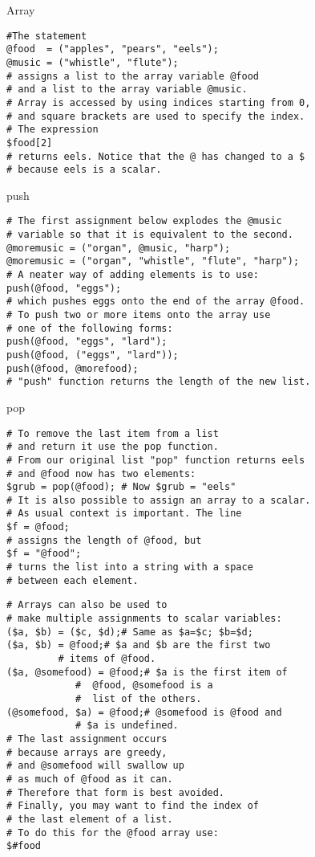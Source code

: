 \begin{frame}[containsverbatim]{Array}
\lstset{language=perl}
\begin{lstlisting}
#The statement 
@food  = ("apples", "pears", "eels");
@music = ("whistle", "flute");
# assigns a list to the array variable @food
# and a list to the array variable @music. 
# Array is accessed by using indices starting from 0,
# and square brackets are used to specify the index.
# The expression 
$food[2]
# returns eels. Notice that the @ has changed to a $
# because eels is a scalar. 
\end{lstlisting}
\end{frame}

\begin{frame}[containsverbatim]{push}
\lstset{language=perl}
\begin{lstlisting}
# The first assignment below explodes the @music
# variable so that it is equivalent to the second. 
@moremusic = ("organ", @music, "harp");
@moremusic = ("organ", "whistle", "flute", "harp");
# A neater way of adding elements is to use:
push(@food, "eggs");
# which pushes eggs onto the end of the array @food.
# To push two or more items onto the array use
# one of the following forms: 
push(@food, "eggs", "lard");
push(@food, ("eggs", "lard"));
push(@food, @morefood);
# "push" function returns the length of the new list. 
\end{lstlisting}
\end{frame}

\begin{frame}[containsverbatim]{pop}
\lstset{language=perl}
\begin{lstlisting}
# To remove the last item from a list
# and return it use the pop function.
# From our original list "pop" function returns eels
# and @food now has two elements: 
$grub = pop(@food);	# Now $grub = "eels"
# It is also possible to assign an array to a scalar.
# As usual context is important. The line 
$f = @food;
# assigns the length of @food, but 
$f = "@food";
# turns the list into a string with a space
# between each element. 
\end{lstlisting}
\end{frame}


\begin{frame}[containsverbatim]{}
\lstset{language=perl}
\begin{lstlisting}
# Arrays can also be used to 
# make multiple assignments to scalar variables: 
($a, $b) = ($c, $d);# Same as $a=$c; $b=$d;
($a, $b) = @food;# $a and $b are the first two
		 # items of @food.
($a, @somefood) = @food;# $a is the first item of
			#  @food, @somefood is a
			#  list of the others.
(@somefood, $a) = @food;# @somefood is @food and
			# $a is undefined.
# The last assignment occurs
# because arrays are greedy,
# and @somefood will swallow up
# as much of @food as it can.
# Therefore that form is best avoided. 
# Finally, you may want to find the index of
# the last element of a list.
# To do this for the @food array use:
$#food
\end{lstlisting}
\end{frame}


